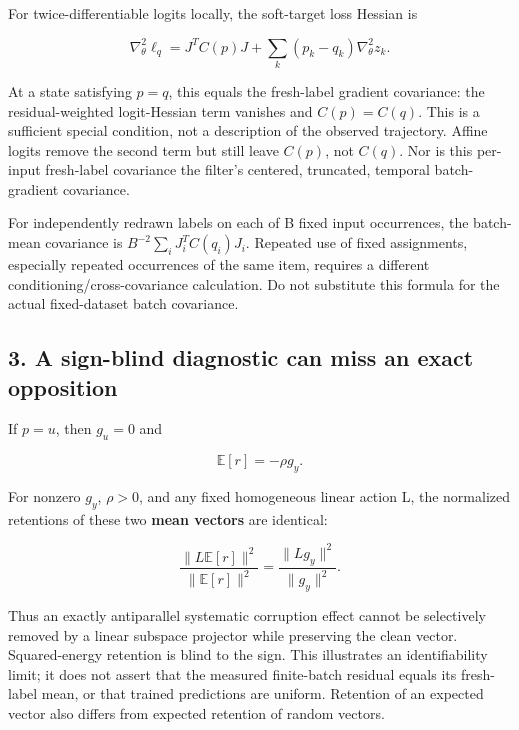 \documentclass[
  british,
  10pt,
  a4paper,
]{article}
\begin{document}
For twice-\allowbreak{}differentiab\allowbreak{}le logits locally, the
soft-\allowbreak{}target loss Hessian is

\[
\nabla_\theta^2\ell_q
=J^TC(p)J+\sum_k(p_k-q_k)\nabla_\theta^2 z_k.
\]

At a state satisfying \(p=q\), this equals the fresh-\allowbreak{}label
gradient covariance: the residual-\allowbreak{}weighted
logit-\allowbreak{}Hessian term vanishes and \(C(p)=C(q)\). This is a
sufficient special condition, not a description of the observed
trajectory.\allowbreak{} Affine logits remove the second term but still
leave \(C(p)\), not \(C(q)\). Nor is this per-input
fresh-\allowbreak{}label covariance the filter's centered, truncated,
temporal batch-\allowbreak{}gradient covariance.\allowbreak{}

For independently redrawn labels on each of B fixed input
occurrences,\allowbreak{} the batch-mean covariance is
\(B^{-2}\sum_i J_i^TC(q_i)J_i\). Repeated use of fixed
assignments,\allowbreak{} especially repeated occurrences of the same
item, requires a different
conditioning\allowbreak{}/\allowbreak{}cross-\allowbreak{}covariance
calculation.\allowbreak{} Do not substitute this formula for the actual
fixed-\allowbreak{}dataset batch covariance.\allowbreak{}

\subsection{3. A sign-blind diagnostic can miss an exact
opposition}\label{label-noise--a-sign-blind-diagnostic-can-miss-an-exact-opposition}

If \(p=u\), then \(g_u=0\) and

\[
\mathbb E[r]=-\rho g_y.
\]

For nonzero \(g_y\), \(\rho>0\), and any fixed homogeneous linear action
L, the normalized retentions of these two \textbf{mean vectors} are
identical:

\[
\frac{\|L\mathbb E[r]\|^2}{\|\mathbb E[r]\|^2}
=\frac{\|Lg_y\|^2}{\|g_y\|^2}.
\]

Thus an exactly antiparallel systematic corruption effect cannot be
selectively removed by a linear subspace projector while preserving the
clean vector. Squared-\allowbreak{}energy retention is blind to the
sign. This illustrates an identifiability limit; it does not assert that
the measured finite-\allowbreak{}batch residual equals its
fresh-\allowbreak{}label mean, or that trained predictions are uniform.
Retention of an expected vector also differs from expected retention of
random vectors.
\end{document}
